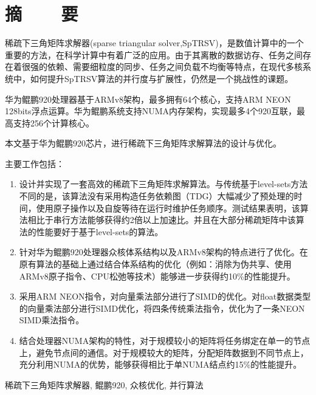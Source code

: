 \renewcommand{\baselinestretch}{1.5}
\fontsize{12pt}{13pt}\selectfont

\chapter[摘要]{摘~~~~要}

稀疏下三角矩阵求解器(sparse triangular solver,SpTRSV)，是数值计算中的一个重要的方法，在科学计算中有着广泛的应用。由于其离散的数据访存、任务之间存在着很强的依赖、需要细粒度的同步、任务之间负载不均衡等特点，在现代多核系统中，如何提升SpTRSV算法的并行度与扩展性，仍然是一个挑战性的课题。

华为鲲鹏920处理器基于ARMv8架构，最多拥有64个核心，支持ARM NEON 128bits浮点运算。华为鲲鹏系统支持NUMA内存架构，实现最多4个920互联，最高支持256个计算核心。

本文基于华为鲲鹏920芯片，进行稀疏下三角矩阵求解算法的设计与优化。

主要工作包括：%
\vspace{-10pt}
\begin{enumerate}
    \item 设计并实现了一套高效的稀疏下三角矩阵求解算法。与传统基于level-sets方法不同的是，该算法没有采用构造任务依赖图（TDG）大幅减少了预处理的时间，使用原子操作以及自旋等待在运行时维护任务顺序。测试结果表明，该算法相比于串行方法能够获得约2倍以上加速比。并且在大部分稀疏矩阵中该算法的性能要好于基于level-sets的算法。
    \item 针对华为鲲鹏920处理器众核体系结构以及ARMv8架构的特点进行了优化。在原有算法的基础上通过结合体系结构的优化（例如：消除为伪共享、使用ARMv8原子指令、CPU松弛等技术）能够进一步获得约10\%的性能提升。
    \item 采用ARM NEON指令，对向量乘法部分进行了SIMD的优化。对float数据类型的向量乘法部分进行SIMD优化，将四条传统乘法指令，优化为了一条NEON SIMD乘法指令。
    \item 结合处理器NUMA架构的特性，对于规模较小的矩阵将任务绑定在单一的节点上，避免节点间的通信。对于规模较大的矩阵，分配矩阵数据到不同节点上，充分利用NUMA的优势，能够获得相比于单NUMA结点约15\%的性能提升。
\end{enumerate}
\vspace{-10pt}

\vspace{1em}
 \quad 稀疏下三角矩阵求解器, 鲲鹏920, 众核优化, 并行算法

\clearpage
\endinput
